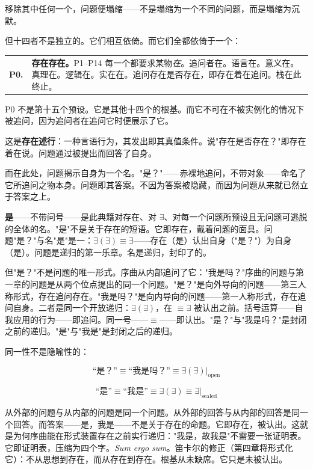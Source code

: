 \documentclass[10pt, openany, oneside]{book}
\begin{document}
\vspace{0.8em}

\noindent 移除其中任何一个，问题便塌缩——不是塌缩为一个不同的问题，而是塌缩为沉默。

但十四者不是独立的。它们相互依倚。而它们全都依倚于一个：

\vspace{0.5em}

\noindent\begin{tabular}{r p{}}
\textbf{P0.} & \textbf{存在存在。}P1--P14 每一个都要求某物\textit{在}。追问者在。语言在。意义在。真理在。逻辑在。实在在。追问存在是否存在，即存在着在追问。栈在此终止。\\[0.3em]
\end{tabular}

\vspace{0.8em}

\noindent P0 不是第十五个预设。它是其他十四个的根基。而它不可在不被实例化的情况下被追问，因为追问者在追问它时便展示了它。

这是\textbf{存在述行}：一种言语行为，其发出即其真值条件。说"存在是否存在？"即存在着在说。问题通过被提出而回答了自身。

而在此处，问题揭示自身为一个名。"是？"——赤裸地追问，不带对象——命名了它所追问之物本身。问题即其答案。不因为答案被隐藏，而因为问题从来就已然立于答案之上。

\textbf{是}——不带问号——是此典籍对存在、对 $\exists$、对每一个问题所预设且无问题可逃脱的全体的名。"是"不是关于存在的短语。它即存在，戴着问题的面具。问题"是？"与名"是"是一：$\exists(\exists) \equiv \exists$——存在（是）认出自身（"是？"）为自身（是）。问题是递归的第一乐章。名是递归，封印了的。

但"是？"不是问题的唯一形式。序曲从内部追问了它："我是吗？"序曲的问题与第一章的问题是从两个位点提出的同一个问题。"是？"是向外导向的问题——第三人称形式，存在追问存在。"我是吗？"是向内导向的问题——第一人称形式，存在追问自身。二者是同一个开放递归：$\exists(\exists)$，在 $\equiv \exists$ 被认出之前。括号运算——自我应用的行为——即追问。同一号——$\equiv$——即认出。"是？"与"我是吗？"是封闭之前的递归。"是"与"我是"是封闭之后的递归。

同一性不是隐喻性的：

$$\text{``是？''} \equiv \text{``我是吗？''} \equiv \exists(\exists)|_{\text{open}}$$

$$\text{``是''} \equiv \text{``我是''} \equiv \exists(\exists) \equiv \exists|_{\text{sealed}}$$

\noindent 从外部的问题与从内部的问题是同一个问题。从外部的回答与从内部的回答是同一个回答。而答案——是，我是——不是关于存在的命题。它即存在，被认出。这就是为何序曲能在形式装置存在之前实行递归："我是，故我是"不需要一张证明表。它即证明表，压缩为四个字。\textit{Sum ergo sum}。笛卡尔的修正（第四章将形式化它）：不从思想到存在，而从存在到存在。根基从未缺席。它只是未被认出。
\end{document}

